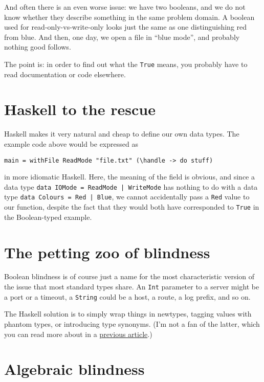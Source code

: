And often there is an even worse issue: we have two booleans, and we do not know whether they describe something in the same problem domain. A boolean used for read-only-vs-write-only looks just the same as one distinguishing red from blue. And then, one day, we open a file in ``blue mode'', and probably nothing good follows.

The point is: in order to find out what the \texttt{True} means, you probably have to read documentation or code elsewhere.



\section{Haskell to the rescue}

Haskell makes it very natural and cheap to define our own data types. The example code above would be expressed as

\begin{verbatim}
main = withFile ReadMode "file.txt" (\handle -> do stuff)
\end{verbatim}
in more idiomatic Haskell. Here, the meaning of the field is obvious, and since a data type \texttt{data IOMode = ReadMode | WriteMode} has nothing to do with a data type \texttt{data Colours = Red | Blue}, we cannot accidentally pass a \texttt{Red} value to our function, despite the fact that they would both have corresponded to \texttt{True} in the Boolean-typed example.




\section{The petting zoo of blindness}


Boolean blindness is of course just a name for the most characteristic version of the issue that most standard types share. An \texttt{Int} parameter to a server might be a port or a timeout, a \texttt{String} could be a host, a route, a log prefix, and so on.

The Haskell solution is to simply wrap things in newtypes, tagging values with phantom types, or introducing type synonyms. (I'm not a fan of the latter, which you can read more about in a \href{https://github.com/quchen/articles/blob/master/tag-dont-type.md}{previous article}.)



\section{Algebraic blindness}


